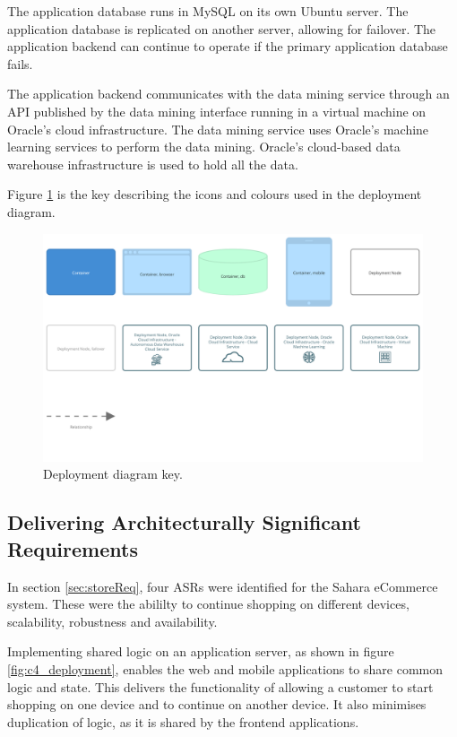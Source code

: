 The application database runs in MySQL on its own Ubuntu server.
The application database is replicated on another server, allowing for failover.
The application backend can continue to operate if the primary application database fails.

The application backend communicates with the data mining service
through an API published by the data mining interface running in a virtual machine on Oracle's cloud infrastructure.
The data mining service uses Oracle's machine learning services to perform the data mining.
Oracle's cloud-based data warehouse infrastructure is used to hold all the data.

Figure \ref{fig:c4_deployment_key} is the key describing the icons and colours used in the deployment diagram.

\begin{figure}[h!]
    \centering
    \begin{adjustwidth}{-7.5mm}{-7.5mm}
        \includegraphics[trim=22 210 22 24,clip,width=0.95\paperwidth]{images/c4/deployment_diagram-key.png}
    \end{adjustwidth}
    \caption{Deployment diagram key.}
    \label{fig:c4_deployment_key}
\end{figure}

\subsection{Delivering Architecturally Significant Requirements}
In section \ref{sec:storeReq}, four ASRs were identified for the Sahara eCommerce system.
These were the abililty to continue shopping on different devices, scalability, robustness and availability.

Implementing shared logic on an application server, as shown in figure \ref{fig:c4_deployment},
enables the web and mobile applications to share common logic and state.
This delivers the functionality of allowing a customer to start shopping on one device and to continue on another device.
It also minimises duplication of logic, as it is shared by the frontend applications.

